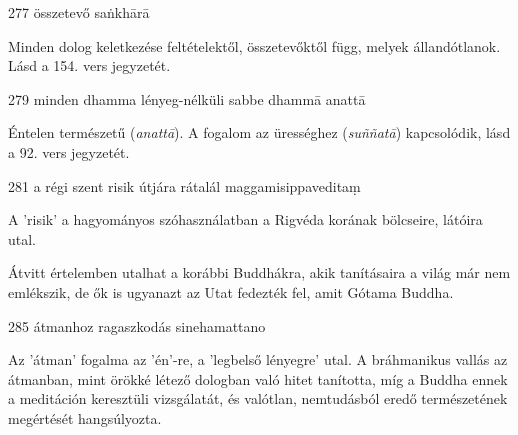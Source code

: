 
\begin{notesdescription}

\item[{277}
{összetevő}
{saṅkhārā}] \hfill\par

Minden dolog keletkezése feltételektől, összetevőktől függ, melyek állandótlanok. Lásd a 154. vers jegyzetét.

\item[{279}
{minden dhamma lényeg-nélküli}
{sabbe dhammā anattā}] \hfill\par

Éntelen természetű (\textit{anattā}). A fogalom az ürességhez (\textit{suññatā}) kapcsolódik, lásd a 92. vers jegyzetét.

\item[{281}
{a régi szent risik útjára rátalál}
{maggamisippaveditaṃ}] \hfill\par

A 'risik' a hagyományos szóhasználatban a Rigvéda korának bölcseire, látóira utal.

Átvitt értelemben utalhat a korábbi Buddhákra, akik tanításaira a világ már nem emlékszik, de ők is ugyanazt az Utat fedezték fel, amit Gótama Buddha.

\item[{285}
{átmanhoz ragaszkodás}
{sinehamattano}] \hfill\par

Az 'átman' fogalma az 'én'-re, a 'legbelső lényegre' utal. A bráhmanikus vallás az átmanban, mint örökké létező dologban való hitet tanította, míg a Buddha ennek a meditáción keresztüli vizsgálatát, és valótlan, nemtudásból eredő természetének megértését hangsúlyozta.

\end{notesdescription}

